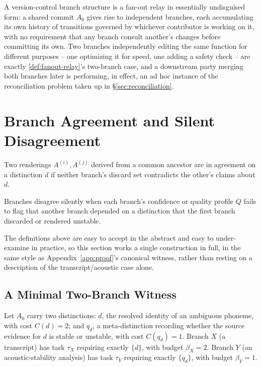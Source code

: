 \begin{example}
\label{ex:git-fanout}
A version-control branch structure is a fan-out relay in essentially
undisguised form: a shared commit $A_0$ gives rise to independent
branches, each accumulating its own history of transitions governed by
whichever contributor is working on it, with no requirement that any
branch consult another's changes before committing its own. Two branches
independently editing the same function for different purposes -- one
optimizing it for speed, one adding a safety check -- are exactly
\cref{def:fanout-relay}'s two-branch case, and a downstream party merging
both branches later is performing, in effect, an ad hoc instance of the
reconciliation problem taken up in \S\ref{sec:reconciliation}.
\end{example}

\section{Branch Agreement and Silent Disagreement}

\begin{definition}
\label{def:branch-agreement}
Two renderings $A^{(i)}, A^{(j)}$ derived from a common ancestor are in
agreement on a distinction $d$ if neither branch's discard set
contradicts the other's claims about $d$.
\end{definition}

\begin{definition}
\label{def:silent-disagreement}
Branches disagree silently when each branch's confidence or quality
profile $Q$ fails to flag that another branch depended on a distinction
that the first branch discarded or rendered unstable.
\end{definition}

The definitions above are easy to accept in the abstract and easy to
under-examine in practice, so this section works a single construction
in full, in the same style as Appendix~\ref{app:proof}'s canonical
witness, rather than resting on a description of the transcript/acoustic
case alone.

\subsection{A Minimal Two-Branch Witness}

\begin{construction}
\label{con:two-branch}
Let $A_0$ carry two distinctions: $d$, the resolved identity of an
ambiguous phoneme, with cost $C(d) = 2$; and $q_d$, a meta-distinction
recording whether the source evidence for $d$ is stable or unstable, with
cost $C(q_d) = 1$. Branch $X$ (a transcript) has task $\tau_X$ requiring
exactly $\{d\}$, with budget $\beta_X = 2$. Branch $Y$ (an
acoustic-stability analysis) has task $\tau_Y$ requiring exactly
$\{q_d\}$, with budget $\beta_Y = 1$.
\end{construction}

